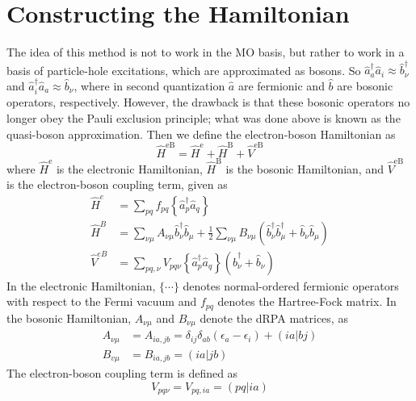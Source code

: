 \section{Constructing the Hamiltonian}
The idea of this method is not to work in the MO basis, but rather to work in a basis of particle-hole excitations, which are approximated as bosons. So $\hat{a}_a^\dagger \hat{a}_i \approx \hat{b}_\nu^\dag$ and $\hat{a}_i^\dagger \hat{a}_a \approx \hat{b}_\nu$, where in second quantization $\hat{a}$ are fermionic and $\hat{b}$ are bosonic operators, respectively. However, the drawback is that these bosonic operators no longer obey the Pauli exclusion principle; what was done above is known as the quasi-boson approximation. Then we define the electron-boson Hamiltonian as
\begin{equation}
\hat{H}^{\mathrm{eB}}=\hat{H}^{\mathrm{e}}+\hat{H}^{\mathrm{B}}+\hat{V}^{\mathrm{eB}}
\end{equation}
where $\hat{H}^{\mathrm{e}}$ is the electronic Hamiltonian, $\hat{H}^{\mathrm{B}}$ is the bosonic Hamiltonian, and $\hat{V}^{\mathrm{eB}}$ is the electron-boson coupling term, given as
\begin{align}
\hat{H}^e&=\sum_{p q} f_{p q}\left\{\hat{a}_p^{\dagger} \hat{a}_q\right\} \\
\hat{H}^{B}&=\sum_{\nu \mu} A_{\nu \mu} \hat{b}_\nu^{\dagger} \hat{b}_\mu+\frac{1}{2} \sum_{\nu \mu} B_{\nu \mu}\left(\hat{b}_\nu^{\dagger} \hat{b}_\mu^{\dagger}+\hat{b}_\nu \hat{b}_\mu\right)
\label{b} \\
\hat{V}^{eB}&=\sum_{p q, \nu} V_{p q \nu}\left\{\hat{a}_p^{\dagger} \hat{a}_q\right\}\left(\hat{b}_\nu^{\dagger}+\hat{b}_\nu\right)
\label{eb}
\end{align}
In the electronic Hamiltonian, $\{\cdots\}$ denotes normal-ordered fermionic operators with respect to the Fermi vacuum and $f_{p q}$ denotes the Hartree-Fock matrix. In the bosonic Hamiltonian, $A_{\nu \mu}$ and $B_{\nu \mu}$ denote the dRPA matrices, as
\begin{equation}
\begin{split}
A_{\nu \mu}&=A_{i a, j b}=\delta_{i j} \delta_{a b}\left(\epsilon _a-\epsilon _i\right)+(ia|bj) \\
B_{v \mu}&=B_{i a, j b}=(i a | j b)
\end{split}
\end{equation}
The electron-boson coupling term is defined as
\begin{equation}
V_{p q \nu}=V_{p q, i a}=(p q| i a)
\end{equation}
